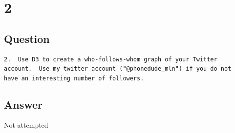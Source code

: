 \documentclass[letterpaper,11pt]{article}
\begin{document}
\clearpage


\clearpage


\clearpage



\newpage

\section*{2}

\subsection*{Question}

\begin{verbatim}
2.  Use D3 to create a who-follows-whom graph of your Twitter
account.  Use my twitter account ("@phonedude_mln") if you do not
have an interesting number of followers.
\end{verbatim}

\subsection*{Answer}

Not attempted


\clearpage


\end{document}
